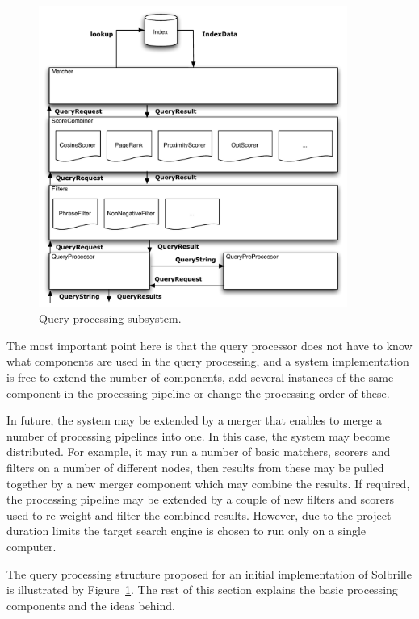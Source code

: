 \begin{figure}[ht]
	\centering
	\includegraphics[width=0.9\textwidth]{include/query_processing.pdf}
	\caption{Query processing subsystem.}\label{fig:query_processing}
\end{figure}

The most important point here is that the query processor does not have to know what components are used in the query processing, and a system implementation is free to extend the number of components, add several instances of the same component in the processing pipeline or change the processing order of these. 

In future, the system may be extended by a merger that enables to merge a number of processing pipelines into one. In this case, the system may become distributed. For example, it may run a number of basic matchers, scorers and filters on a number of different nodes, then results from these may be pulled together by a new merger component which may combine the results. If required, the processing pipeline may be extended by a couple of new filters and scorers used to re-weight and filter the combined results. However, due to the project duration limits the target search engine is chosen to run only on a single computer.

The query processing structure proposed for an initial implementation of Solbrille is illustrated by Figure~\ref{fig:query_processing}. The rest of this section explains the basic processing components and the ideas behind.

